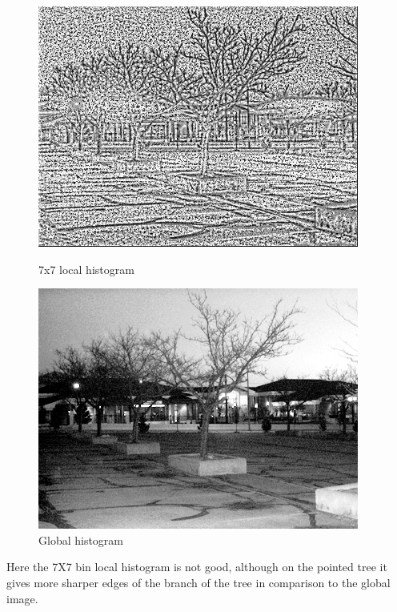 \documentclass{article}
\begin{document}
\begin{figure}[!htb]
    \centering
    \begin{minipage}[b]{0.45\textwidth}
        \includegraphics[width=\textwidth]{LC1_local_7.jpg}
        \caption{7x7 local histogram}
    \end{minipage}
    \begin{minipage}[b]{0.45\textwidth}
        \includegraphics[width=\textwidth]{LC1_global.png}
        \caption{Global histogram}
    \end{minipage}
\end{figure}

Here the 7X7 bin local histogram is not good, although on the pointed tree it gives more sharper edges of the branch of the tree in comparison to the global image.
\end{document}

